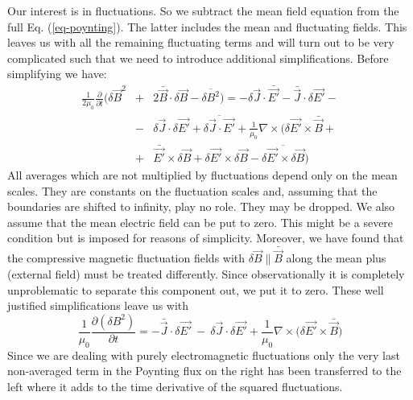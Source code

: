 \documentclass[ ]{copernicus2}
\begin{document}
{{{{Our interest is in fluctuations. So we subtract the mean field equation from the full Eq. (\ref{eq-poynting}). The latter includes the mean and fluctuating fields. This leaves us with all the remaining fluctuating terms and will turn out to be very complicated such that we need to introduce additional simplifications. Before simplifying we have:
\begin{eqnarray*}
\frac{1}{2\mu_0}\frac{\partial}{\partial t}\Big(\delta\vec{B}^2 &+& 2\bar{\vec{B}}\cdot\delta\vec{B}-\overline{\delta B^2}\Big) = -\delta\vec{J}\cdot\bar{\vec{E'}}-\bar{\vec{J}}\cdot\delta\vec{E'}-\nonumber \\
&-&\delta\vec{J}\cdot\delta\vec{E'}+\overline{\delta\vec{J}\cdot\vec{E'}}+\frac{1}{\mu_0}\nabla\times\Big(\delta\vec{E'}\times\bar{\vec{B}}+\nonumber\\
&+&\bar{\vec{E'}}\times\delta\vec{B}+\delta\vec{E'}\times\delta\vec{B}-\overline{\delta\vec{E'}\times\delta\vec{B}}\Big)
\end{eqnarray*}
All averages which are not multiplied by fluctuations depend only on the mean scales. They are constants on the fluctuation scales and, assuming that the boundaries are shifted to infinity, play no role. They may be dropped. We also assume that the mean electric field can be put to zero. This might be a severe condition but is imposed for reasons of simplicity. Moreover, we have found that the compressive magnetic fluctuation fields with $\delta\vec{B}\|\bar{\vec{B}}$ along the mean plus (external field) must be treated differently. Since observationally it is completely unproblematic to separate this component out, we put it to zero. These well justified simplifications leave us with
\begin{displaymath}
\frac{1}{\mu_0}\frac{\partial(\delta{B}^2)}{\partial t} = -\bar{\vec{J}}\cdot\delta\vec{E'}\ -\ 
\delta\vec{J}\cdot\delta\vec{E'}+\frac{1}{\mu_0}\nabla\times\Big(\delta\vec{E'}\times\bar{\vec{B}}
\Big)
\end{displaymath}
Since we are dealing with purely electromagnetic fluctuations only the very last non-averaged term in the Poynting flux on the right has been transferred to the left where it adds to the time derivative of the squared fluctuations. }  

}}}
\end{document}
